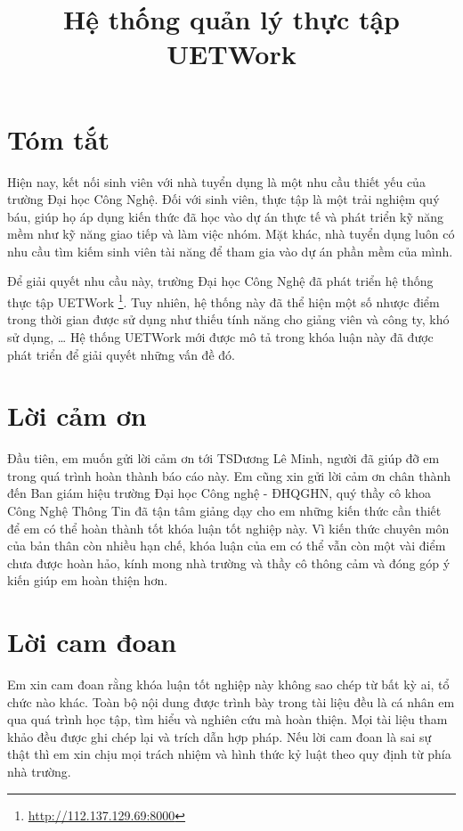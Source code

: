 \documentclass[12pt,a4paper]{report}
\title{Hệ thống quản lý thực tập UETWork}
\begin{document}

\clearpage{}

\chapter*{Tóm tắt}

Hiện nay, kết nối sinh viên với nhà tuyển dụng là một nhu cầu thiết yếu của trường Đại học Công Nghệ. Đối với sinh viên, thực tập là một trải nghiệm quý báu, giúp họ áp dụng kiến thức đã học vào dự án thực tế và phát triển kỹ năng mềm như kỹ năng giao tiếp và làm việc nhóm. Mặt khác, nhà tuyển dụng luôn có nhu cầu tìm kiếm sinh viên tài năng để tham gia vào dự án phần mềm của mình.

Để giải quyết nhu cầu này, trường Đại học Công Nghệ đã phát triển hệ thống thực tập UETWork \footnote{\url{http://112.137.129.69:8000}}. Tuy nhiên, hệ thống này đã thể hiện một số nhược điểm trong thời gian được sử dụng như thiếu tính năng cho giảng viên và công ty, khó sử dụng, \ldots{} Hệ thống UETWork mới được mô tả trong khóa luận này đã được phát triển để giải quyết những vấn đề đó.

\chapter*{Lời cảm ơn}

Đầu tiên, em muốn gửi lời cảm ơn tới TS\. Dương Lê Minh, người đã giúp đỡ em trong quá trình hoàn thành báo cáo này.
Em cũng xin gửi lời cảm ơn chân thành đến Ban giám hiệu trường Đại học Công nghệ - ĐHQGHN, quý thầy cô khoa Công Nghệ Thông Tin đã tận tâm giảng dạy cho em những kiến thức cần thiết để em có thể hoàn thành tốt khóa luận tốt nghiệp này.
Vì kiến thức chuyên môn của bản thân còn nhiều hạn chế, khóa luận của em có thể vẫn còn một vài điểm chưa được hoàn hảo, kính mong nhà trường và thầy cô thông cảm và đóng góp ý kiến giúp em hoàn thiện hơn.

\chapter*{Lời cam đoan}

Em xin cam đoan rằng khóa luận tốt nghiệp này không sao chép từ bất kỳ ai, tổ chức nào khác. Toàn bộ nội dung được trình bày trong tài liệu đều là cá nhân em qua quá trình học tập, tìm hiểu và nghiên cứu mà hoàn thiện. Mọi tài liệu tham khảo đều được ghi chép lại và trích dẫn hợp pháp. Nếu lời cam đoan là sai sự thật thì em xin chịu mọi trách nhiệm và hình thức kỷ luật theo quy định từ phía nhà trường.
\end{document}
